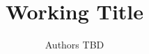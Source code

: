 \documentclass{article}
\title{Working Title}
\author{%
  Authors TBD
}
\begin{document}
\maketitle












\nocite{*} %


\appendix


\newpage

\end{document}
